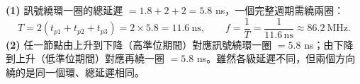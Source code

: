 \documentclass[12pt]{article}
\begin{document}
\begin{minipage}{0.60\linewidth}
\end{minipage}\hfill
\begin{minipage}{0.37\linewidth}
\end{minipage}

\sol
\textbf{(1)} 訊號繞環一圈的總延遲 $=1.8+2+2=5.8$ ns，一個完整週期需繞兩圈：
\[ T=2(t_{p1}+t_{p2}+t_{p3})=2\times5.8=11.6\ \text{ns},\qquad
   f=\frac{1}{T}=\frac{1}{11.6\,\text{ns}}\approx86.2\ \text{MHz}. \]
\textbf{(2)} 任一節點由上升到下降（高準位期間）對應訊號繞環一圈 $=5.8$ ns；由下降到上升（低準位期間）對應再繞一圈 $=5.8$ ns。雖然各級延遲不同，但兩個方向繞的是同一個環、總延遲相同。
\end{document}
